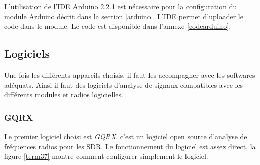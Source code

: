 \vspace{0.1cm}

L'utilisation de l'IDE Arduino 2.2.1 est nécessaire pour la configuration du module Arduino décrit dans la section \ref{arduino}. L'IDE permet d'uploader le code  dans le module. Le code est disponible dans l'annexe \ref{codearduino}.

\subsection{Logiciels}\label{fft}

Une fois les différents appareils choisis, il faut les accompagner avec les softwares adéquats. Ainsi il faut des logiciels d'analyse de signaux compatibles avec les différents modules et radios logicielles.

\subsubsection{GQRX}

Le premier logiciel choisi est \textit{GQRX}. c'est un logiciel open source d'analyse de fréquences radios pour les SDR. Le fonctionnement du logiciel est assez direct, la figure \ref{term37} montre comment configurer simplement le logiciel.


